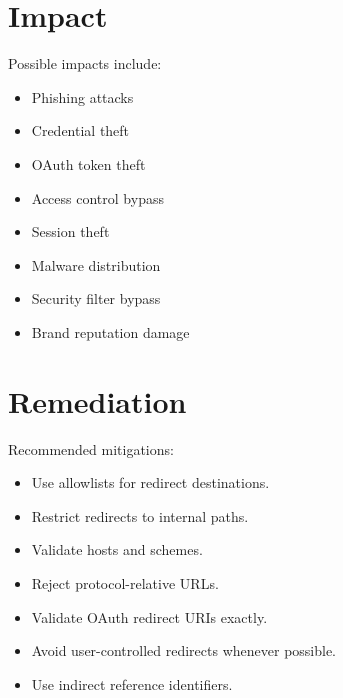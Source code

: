 \documentclass{article}
\begin{document}

\section{Impact}

Possible impacts include:

\begin{itemize}
\item Phishing attacks
\item Credential theft
\item OAuth token theft
\item Access control bypass
\item Session theft
\item Malware distribution
\item Security filter bypass
\item Brand reputation damage
\end{itemize}


\section{Remediation}

Recommended mitigations:

\begin{itemize}
\item Use allowlists for redirect destinations.
\item Restrict redirects to internal paths.
\item Validate hosts and schemes.
\item Reject protocol-relative URLs.
\item Validate OAuth redirect URIs exactly.
\item Avoid user-controlled redirects whenever possible.
\item Use indirect reference identifiers.
\end{itemize}

\end{document}
